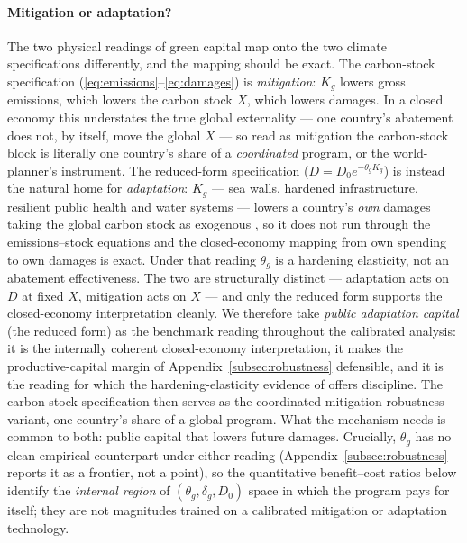\documentclass[12pt]{article}
\begin{document}
\paragraph{Mitigation or adaptation?} The two physical readings of green
capital map onto the two climate specifications differently, and the mapping
should be exact. The carbon-stock specification
(\eqref{eq:emissions}--\eqref{eq:damages}) is \emph{mitigation}: $K_g$ lowers
gross emissions, which lowers the carbon stock $X$, which lowers damages. In
a closed economy this understates the true global externality --- one
country's abatement does not, by itself, move the global $X$ --- so read as
mitigation the carbon-stock block is literally one country's share of a
\emph{coordinated} program, or the world-planner's instrument. The
reduced-form specification ($D=D_0e^{-\theta_g K_g}$) is instead
the natural home for \emph{adaptation}: $K_g$ --- sea walls, hardened
infrastructure, resilient public health and water systems --- lowers a
country's \emph{own} damages taking the global carbon stock as exogenous
\citep{fried2022seawalls,konradtweder2023}, so it does not run through the
emissions--stock equations and the closed-economy mapping from own spending
to own damages is exact. Under that reading $\theta_g$ is a hardening
elasticity, not an abatement effectiveness. The two are structurally distinct
--- adaptation acts on $D$ at fixed $X$, mitigation acts on $X$ --- and only
the reduced form supports the closed-economy interpretation cleanly. We
therefore take \emph{public adaptation capital} (the reduced form) as the
benchmark reading throughout the calibrated analysis: it is
the internally coherent closed-economy interpretation, it makes the
productive-capital margin of Appendix~\ref{subsec:robustness} defensible, and
it is the reading for which the hardening-elasticity evidence of
\citet{fried2022seawalls} offers discipline. The carbon-stock specification
then serves as the coordinated-mitigation robustness variant, one country's share
of a global program. What the mechanism needs is common to both: public
capital that lowers future damages.
Crucially, $\theta_g$ has no clean empirical counterpart under either reading
(Appendix~\ref{subsec:robustness} reports it as a frontier, not a point), so
the quantitative benefit--cost ratios below identify the \emph{internal
region} of $(\theta_g,\delta_g,D_0)$ space in which the program pays for
itself; they are not magnitudes trained on a calibrated mitigation or
adaptation technology.

\end{document}
